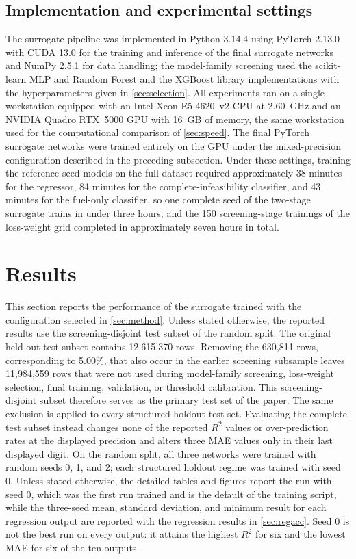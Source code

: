 \documentclass[final,5p,times,twocolumn,numbers]{elsarticle}
\begin{document}
\subsection{Implementation and experimental settings}\label{sec:env}
The surrogate pipeline was implemented in Python 3.14.4 using PyTorch 2.13.0 with CUDA 13.0 for the training and inference of the final surrogate networks and NumPy 2.5.1 for data handling; the model-family screening used the scikit-learn MLP and Random Forest and the XGBoost library implementations with the hyperparameters given in \autoref{sec:selection}. All experiments ran on a single workstation equipped with an Intel Xeon E5-4620~v2 CPU at 2.60~GHz and an NVIDIA Quadro RTX~5000 GPU with 16~GB of memory, the same workstation used for the computational comparison of \autoref{sec:speed}. The final PyTorch surrogate networks were trained entirely on the GPU under the mixed-precision configuration described in the preceding subsection. Under these settings, training the reference-seed models on the full dataset required approximately 38 minutes for the regressor, 84 minutes for the complete-infeasibility classifier, and 43 minutes for the fuel-only classifier, so one complete seed of the two-stage surrogate trains in under three hours, and the 150 screening-stage trainings of the loss-weight grid completed in approximately seven hours in total.
\section{Results}\label{sec:results}
This section reports the performance of the surrogate trained with the configuration selected in \autoref{sec:method}. Unless stated otherwise, the reported results use the screening-disjoint test subset of the random split. The original held-out test subset contains 12{,}615{,}370 rows. Removing the 630{,}811 rows, corresponding to 5.00\%, that also occur in the earlier screening subsample leaves 11{,}984{,}559 rows that were not used during model-family screening, loss-weight selection, final training, validation, or threshold calibration. This screening-disjoint subset therefore serves as the primary test set of the paper. The same exclusion is applied to every structured-holdout test set. Evaluating the complete test subset instead changes none of the reported $R^2$ values or over-prediction rates at the displayed precision and alters three MAE values only in their last displayed digit. On the random split, all three networks were trained with random seeds 0, 1, and 2; each structured holdout regime was trained with seed 0. Unless stated otherwise, the detailed tables and figures report the run with seed 0, which was the first run trained and is the default of the training script, while the three-seed mean, standard deviation, and minimum result for each regression output are reported with the regression results in \autoref{sec:regacc}. Seed 0 is not the best run on every output: it attains the highest $R^2$ for six and the lowest MAE for six of the ten outputs.
\end{document}
